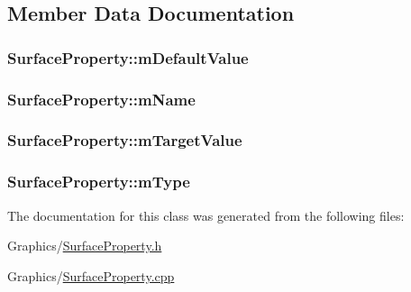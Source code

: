 \subsection{Member Data Documentation}
\subsubsection[{\texorpdfstring{m\+Default\+Value}{mDefaultValue}}]{ Surface\+Property\+::m\+Default\+Value\hspace{0.3cm}{\ttfamily [private]}}\hypertarget{classSurfaceProperty_aa95ba56c0c3fc68de72252da61057db4}{}\label{classSurfaceProperty_aa95ba56c0c3fc68de72252da61057db4}
\subsubsection[{\texorpdfstring{m\+Name}{mName}}]{ Surface\+Property\+::m\+Name\hspace{0.3cm}{\ttfamily [private]}}\hypertarget{classSurfaceProperty_a4870f574baaab9a87d727c17c8808f76}{}\label{classSurfaceProperty_a4870f574baaab9a87d727c17c8808f76}
\subsubsection[{\texorpdfstring{m\+Target\+Value}{mTargetValue}}]{ Surface\+Property\+::m\+Target\+Value\hspace{0.3cm}{\ttfamily [private]}}\hypertarget{classSurfaceProperty_a50fb9a1fd99cfdb17f78e2f55333e443}{}\label{classSurfaceProperty_a50fb9a1fd99cfdb17f78e2f55333e443}
\subsubsection[{\texorpdfstring{m\+Type}{mType}}]{ Surface\+Property\+::m\+Type\hspace{0.3cm}{\ttfamily [private]}}\hypertarget{classSurfaceProperty_a0b8b655662c624a062652739d370213e}{}\label{classSurfaceProperty_a0b8b655662c624a062652739d370213e}


The documentation for this class was generated from the following files\+:\begin{DoxyCompactItemize}
\item 
Graphics/\hyperlink{SurfaceProperty_8h}{Surface\+Property.\+h}\item 
Graphics/\hyperlink{SurfaceProperty_8cpp}{Surface\+Property.\+cpp}\end{DoxyCompactItemize}

